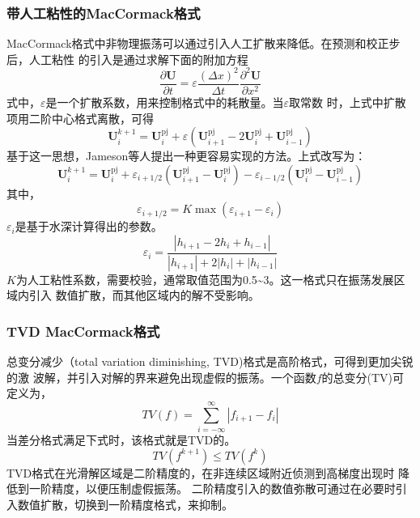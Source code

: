 \subsubsection{带人工粘性的MacCormack格式}
MacCormack格式中非物理振荡可以通过引入人工扩散来降低。在预测和校正步后，人工粘性
的引入是通过求解下面的附加方程
\begin{equation}
  \frac{\partial \mathbf{U}}{\partial t} =
  \varepsilon
  \frac{(\Delta x)^{2}}{\Delta t}
  \frac{{\partial}^{2}\mathbf{U}}{\partial x^{2}}
\end{equation}
式中，$\varepsilon$是一个扩散系数，用来控制格式中的耗散量。当$\varepsilon$取常数
时，上式中扩散项用二阶中心格式离散，可得
\begin{equation}
  \mathbf{U}_{i}^{k+1} =
  \mathbf{U}_{i}^{\mathrm{pj}} +
  \varepsilon
  (
  \mathbf{U}_{i+1}^{\mathrm{pj}} - 
  2\mathbf{U}_{i}^{\mathrm{pj}} +
  \mathbf{U}_{i-1}^{\mathrm{pj}}
  )
\end{equation}
基于这一思想，Jameson等人\cite{ref6}提出一种更容易实现的方法。上式改写为：
\begin{equation}
  \mathbf{U}_{i}^{k+1} =
  \mathbf{U}_{i}^{\mathrm{pj}} +
  {\varepsilon}_{i+1/2}
  (
  \mathbf{U}_{i+1}^{\mathrm{pj}} - 
  \mathbf{U}_{i}^{\mathrm{pj}}
  )
  -
  {\varepsilon}_{i-1/2}
  (
  \mathbf{U}_{i}^{\mathrm{pj}} -
  \mathbf{U}_{i-1}^{\mathrm{pj}}
  )
\end{equation}
其中，
\begin{equation}
  {\varepsilon}_{i+1/2} =
  K\max({\varepsilon}_{i+1}-{\varepsilon}_{i})
\end{equation}
${\varepsilon}_{i}$是基于水深计算得出的参数。
\begin{equation}
  {\varepsilon}_{i} =
  \frac{|h_{i+1}-2h_{i}+h_{i-1}|}{|h_{i+1}|+2|h_{i}|+|h_{i-1}|}
\end{equation}
$K$为人工粘性系数，需要校验，通常取值范围为0.5\textasciitilde 3。这一格式只在振荡发展区域内引入
数值扩散，而其他区域内的解不受影响。

\subsubsection{TVD MacCormack格式}
总变分减少（total variation diminishing, TVD)格式是高阶格式，可得到更加尖锐的激
波解，并引入对解的界来避免出现虚假的振荡。一个函数$f$的总变分(TV)可定义为，
\begin{equation}
  TV(f) =
  \sum_{i=-\infty}^{\infty}
  |{f}_{i+1} - {f}_{i}|
\end{equation}
当差分格式满足下式时，该格式就是TVD的。
\begin{equation}
  TV({f}^{k+1}) \le TV({f}^{k})
\end{equation}
TVD格式在光滑解区域是二阶精度的，在非连续区域附近侦测到高梯度出现时
降低到一阶精度，以便压制虚假振荡。
二阶精度引入的数值弥散可通过在必要时引入数值扩散，切换到一阶精度格式，来抑制。

